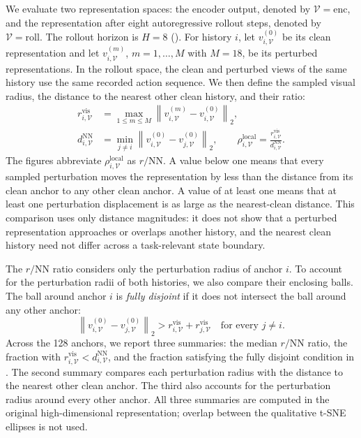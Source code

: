 \documentclass{article}
\begin{document}
We evaluate two representation spaces: the encoder output, denoted by
$\mathcal V=\mathrm{enc}$, and the representation after eight autoregressive
rollout steps, denoted by $\mathcal V=\mathrm{roll}$. The rollout horizon is
$H=8$ (). For history $i$, let
$v_{i,\mathcal V}^{(0)}$ be its clean representation and let
$v_{i,\mathcal V}^{(m)}$, $m=1,\ldots,M$ with $M=18$, be its perturbed
representations. In the rollout space, the clean and perturbed views of the
same history use the same recorded action sequence. We then define the sampled
visual radius, the distance to the nearest other clean history, and their ratio:
\begin{align}
r_{i,\mathcal V}^{\mathrm{vis}}
&=\max_{1\leq m\leq M}
\left\|v_{i,\mathcal V}^{(m)}-v_{i,\mathcal V}^{(0)}\right\|_2,
\nonumber\\
d_{i,\mathcal V}^{\mathrm{NN}}
&=\min_{j\neq i}
\left\|v_{i,\mathcal V}^{(0)}-v_{j,\mathcal V}^{(0)}\right\|_2,
\qquad
\rho_{i,\mathcal V}^{\mathrm{local}}
=\frac{r_{i,\mathcal V}^{\mathrm{vis}}}
{d_{i,\mathcal V}^{\mathrm{NN}}}.
\label{eq:local-radius-spacing}
\end{align}
The figures abbreviate $\rho_{i,\mathcal V}^{\mathrm{local}}$ as
$r/\mathrm{NN}$. A value below one means that every sampled perturbation moves
the representation by less than the distance from its clean anchor to any
other clean anchor. A value of at least one means that at least one
perturbation displacement is as large as the nearest-clean distance. This
comparison uses only distance magnitudes: it does not show that a perturbed
representation approaches or overlaps another history, and the nearest clean
history need not differ across a task-relevant state boundary.

The $r/\mathrm{NN}$ ratio considers only the perturbation radius of anchor
$i$. To account for the perturbation radii of both histories, we also compare
their enclosing balls. The ball around anchor $i$ is \emph{fully disjoint} if
it does not intersect the ball around any other anchor:
\begin{equation}
\left\|v_{i,\mathcal V}^{(0)}-v_{j,\mathcal V}^{(0)}\right\|_2
>
r_{i,\mathcal V}^{\mathrm{vis}}+r_{j,\mathcal V}^{\mathrm{vis}}
\quad\text{for every }j\neq i.
\label{eq:local-cloud-disjoint}
\end{equation}
Across the 128 anchors, we report three summaries: the median
$r/\mathrm{NN}$ ratio, the fraction with
$r_{i,\mathcal V}^{\mathrm{vis}}<d_{i,\mathcal V}^{\mathrm{NN}}$, and the
fraction satisfying the fully disjoint condition in
. The second summary compares each perturbation
radius with the distance to the nearest other clean anchor. The third also
accounts for the perturbation radius around every other anchor. All three
summaries are computed in the original high-dimensional representation;
overlap between the qualitative t-SNE ellipses is not used.
\end{document}
